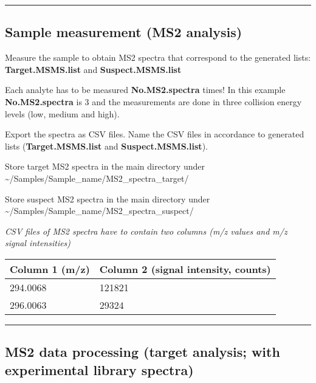 \documentclass[]{article}
\begin{document}
\begin{center}\rule{0.5\linewidth}{\linethickness}\end{center}

\subsection{Sample measurement (MS2
analysis)}\label{sample-measurement-ms2-analysis}

Measure the sample to obtain MS2 spectra that correspond to the
generated lists: \textbf{Target.MSMS.list} and
\textbf{Suspect.MSMS.list}

Each analyte has to be measured \textbf{No.MS2.spectra} times! In this
example \textbf{No.MS2.spectra} is 3 and the measurements are done in
three collision energy levels (low, medium and high).

Export the spectra as CSV files. Name the CSV files in accordance to
generated lists (\textbf{Target.MSMS.list} and
\textbf{Suspect.MSMS.list}).

Store target MS2 spectra in the main directory under
\textasciitilde{}/Samples/Sample\_name/MS2\_spectra\_target/

Store suspect MS2 spectra in the main directory under
\textasciitilde{}/Samples/Sample\_name/MS2\_spectra\_suspect/

\emph{CSV files of MS2 spectra have to contain two columns (m/z values
and m/z signal intensities)}

\begin{longtable}[]{@{}ll@{}}
\toprule
Column 1 (m/z) & Column 2 (signal intensity, counts)\tabularnewline
\midrule
\endhead
294.0068 & 121821\tabularnewline
296.0063 & 29324\tabularnewline
\bottomrule
\end{longtable}

\begin{center}\rule{0.5\linewidth}{\linethickness}\end{center}

\subsection{MS2 data processing (target analysis; with experimental
library
spectra)}\label{ms2-data-processing-target-analysis-with-experimental-library-spectra}
\end{document}
